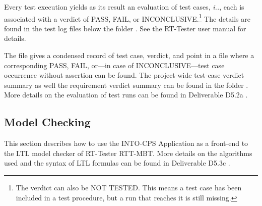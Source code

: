 Every test execution yields as its result an
evaluation of test cases, \emph{i.\@e.\@}, each is associated with a verdict of PASS, FAIL, or
INCONCLUSIVE.\footnote{The verdict can also be NOT TESTED.  This means a
test case has been included in a test procedure, but a run that reaches it is still missing.}
The details are found in the test log files below the folder .  See the RT-Tester user manual
\cite{VSI-rtt-man} for details. 

The file 
gives a condensed record of test case,
verdict, and point in a  file where a corresponding PASS, FAIL,
or---in case of INCONCLUSIVE---test case occurrence without assertion can be found.  The project-wide test-case verdict summary as well the requirement verdict summary
can be found in the folder .
%
More details on the evaluation of test runs can be found in Deliverable D5.2a \cite{INTOCPSD5.2a}.
%
%
%
\subsection{Model Checking}\label{section:model:user-interface-integration}
This section describes how to use the INTO-CPS Application
as a front-end to the LTL model checker of RT-Tester RTT-MBT.
More details on the algorithms used and the syntax of
LTL formulas can be found in Deliverable D5.3c \cite{INTOCPSD5.3c}.

